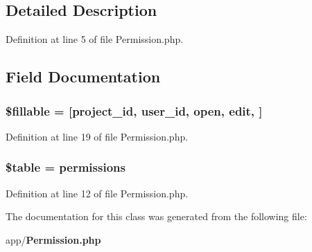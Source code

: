 \subsection{Detailed Description}


Definition at line 5 of file Permission.\+php.



\subsection{Field Documentation}
\subsubsection[{\$fillable}]{\setlength{\rightskip}{0pt plus 5cm}\${\bf fillable} = [\textquotesingle{}project\+\_\+id\textquotesingle{}, \textquotesingle{}user\+\_\+id\textquotesingle{}, \textquotesingle{}open\textquotesingle{}, \textquotesingle{}edit\textquotesingle{}, \textquotesingle{}]\hspace{0.3cm}{\ttfamily [protected]}}\label{class_app_1_1_permission_a6a90e74ccdf5efd70d51d10c906f8e32}


Definition at line 19 of file Permission.\+php.

\subsubsection[{\$table}]{\setlength{\rightskip}{0pt plus 5cm}\$table = \textquotesingle{}permissions\textquotesingle{}\hspace{0.3cm}{\ttfamily [protected]}}\label{class_app_1_1_permission_ae8876a14058f368335baccf35af4a22b}


Definition at line 12 of file Permission.\+php.



The documentation for this class was generated from the following file\+:\begin{DoxyCompactItemize}
\item 
app/{\bf Permission.\+php}\end{DoxyCompactItemize}
